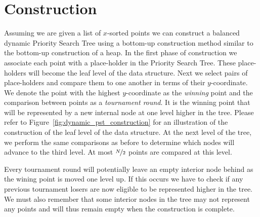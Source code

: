 \documentclass[twoside,11pt,openright]{report}
\begin{document}
\section{Construction}
Assuming we are given a list of $x$-sorted points we can construct a balanced dynamic Priority Search Tree using a bottom-up construction method similar to the bottom-up construction of a heap. In the first phase of construction we associate each point with a place-holder in the Priority Search Tree. These place-holders will become the leaf level of the data structure. Next we select pairs of place-holders and compare them to one another in terms of their $y$-coordinate. We denote the point with the highest $y$-coordinate as the \textit{winning} point and the comparison between points as a \textit{tournament round}. It is the winning point that will be represented by a new internal node at one level higher in the tree. Please refer to Figure~\ref{fig:dynamic_pst_construction} for an illustration of the construction of the leaf level of the data structure.
At the next level of the tree, we perform the same comparisons as before to determine which nodes will advance to the third level. At most $\nicefrac{N}{2}$ points are compared at this level.

Every tournament round will potentially leave an empty interior node behind as the wining point is moved one level up. If this occurs we have to check if any previous tournament losers are now eligible to be represented higher in the tree. We must also remember that some interior nodes in the tree may not represent any points and will thus remain empty when the construction is complete.
\end{document}
